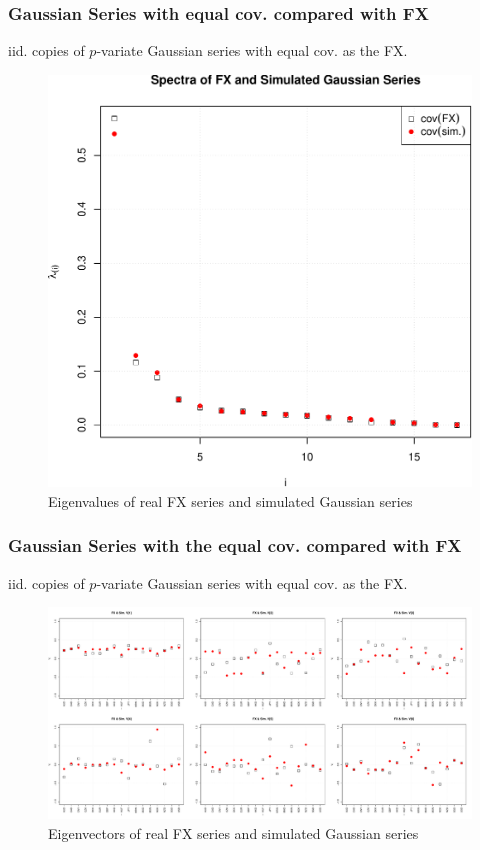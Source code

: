 \documentclass{beamer}
\begin{document}
\begin{frame}
  \frametitle{Gaussian Series with equal cov. compared with FX}
  \begin{minipage}{0.5\linewidth}
    iid. copies of $p$-variate Gaussian series with equal cov. as the FX.
  \end{minipage}\hfill
  \begin{minipage}{0.5\linewidth}
  \begin{figure}[htb!]
    \centering
    \includegraphics[width=1.0\linewidth]{Gaussian_eigenvalues.pdf}
    \caption{\scriptsize Eigenvalues of real FX series and simulated Gaussian series}
  \end{figure}
  \end{minipage}
\end{frame}

\begin{frame}
  \frametitle{Gaussian Series with the equal cov. compared with FX}
  iid. copies of $p$-variate Gaussian series with equal cov. as the FX.
  \begin{figure}[htb!]
    \centering
    \includegraphics[width=1.0\linewidth]{Gaussian_eigenvectors.pdf}
    \caption{\scriptsize Eigenvectors of real FX series and simulated Gaussian series}
  \end{figure}
\end{frame}
\end{document}
